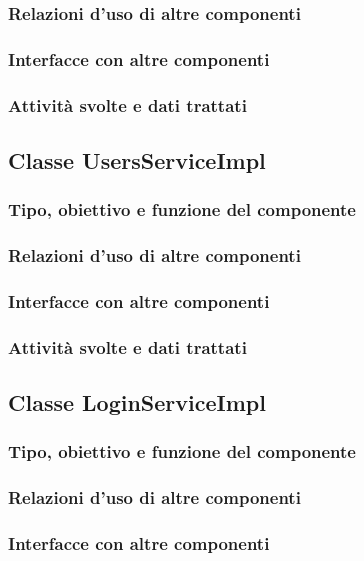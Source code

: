 \subsubsection*{Relazioni d'uso di altre componenti}
\subsubsection*{Interfacce con altre componenti}
\subsubsection*{Attivit\`a svolte e dati trattati}

\subsection{Classe UsersServiceImpl}
\subsubsection*{Tipo, obiettivo e funzione del componente}
\subsubsection*{Relazioni d'uso di altre componenti}
\subsubsection*{Interfacce con altre componenti}
\subsubsection*{Attivit\`a svolte e dati trattati}

\subsection{Classe LoginServiceImpl}
\subsubsection*{Tipo, obiettivo e funzione del componente}
\subsubsection*{Relazioni d'uso di altre componenti}
\subsubsection*{Interfacce con altre componenti}
